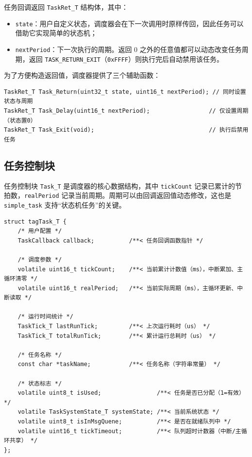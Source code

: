 任务回调返回 \texttt{TaskRet\_T} 结构体，其中：

\begin{itemize}
\item \texttt{state}：用户自定义状态，调度器会在下一次调用时原样传回，因此任务可以借助它实现简单的状态机；
\item \texttt{nextPeriod}：下一次执行的周期。返回 0 之外的任意值都可以动态改变任务周期，返回 \texttt{TASK\_RETURN\_EXIT}（\texttt{0xFFFF}）则执行完后自动禁用该任务。
\end{itemize}

为了方便构造返回值，调度器提供了三个辅助函数：

\begin{lstlisting}[style=c]
TaskRet_T Task_Return(uint32_t state, uint16_t nextPeriod); // 同时设置状态与周期
TaskRet_T Task_Delay(uint16_t nextPeriod);                 // 仅设置周期（状态置0）
TaskRet_T Task_Exit(void);                                 // 执行后禁用任务
\end{lstlisting}

\subsection{任务控制块}

任务控制块 \texttt{Task\_T} 是调度器的核心数据结构，其中 \texttt{tickCount} 记录已累计的节拍数，\texttt{realPeriod} 记录当前周期。周期可以由回调返回值动态修改，这也是 \texttt{simple\_task} 支持“状态机任务”的关键。

\begin{lstlisting}[style=c]
struct tagTask_T {
    /* 用户配置 */
    TaskCallback callback;          /**< 任务回调函数指针 */

    /* 调度参数 */
    volatile uint16_t tickCount;    /**< 当前累计计数值（ms），中断累加、主循环清零 */
    volatile uint16_t realPeriod;   /**< 当前实际周期（ms），主循环更新、中断读取 */

    /* 运行时间统计 */
    TaskTick_T lastRunTick;         /**< 上次运行耗时（us） */
    TaskTick_T totalRunTick;        /**< 累计运行总耗时（us） */

    /* 任务名称 */
    const char *taskName;           /**< 任务名称（字符串常量） */

    /* 状态标志 */
    volatile uint8_t isUsed;                /**< 任务是否已分配（1=有效） */
    volatile TaskSystemState_T systemState; /**< 当前系统状态 */
    volatile uint8_t isInMsgQuene;          /**< 是否在就绪队列中 */
    volatile uint16_t tickTimeout;          /**< 队列超时计数器（中断/主循环共享） */
};
\end{lstlisting}

